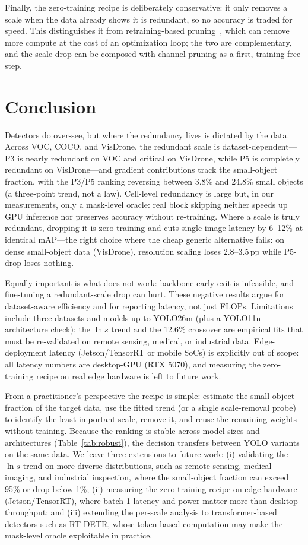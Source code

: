 \documentclass[times,twocolumn,final,authoryear]{elsarticle}
\begin{document}
Finally, the zero-training recipe is deliberately conservative: it only removes a scale when the data already shows it is redundant, so no accuracy is traded for speed. This distinguishes it from retraining-based pruning~\cite{yan2023mccp,han2015pruning}, which can remove more compute at the cost of an optimization loop; the two are complementary, and the scale drop can be composed with channel pruning as a first, training-free step.

\section{Conclusion}
Detectors do over-see, but where the redundancy lives is dictated by the data. Across VOC, COCO, and VisDrone, the redundant scale is dataset-dependent---P3 is nearly redundant on VOC and critical on VisDrone, while P5 is completely redundant on VisDrone---and gradient contributions track the small-object fraction, with the P3/P5 ranking reversing between 3.8\% and 24.8\% small objects (a three-point trend, not a law). Cell-level redundancy is large but, in our measurements, only a mask-level oracle: real block skipping neither speeds up GPU inference nor preserves accuracy without re-training. Where a scale is truly redundant, dropping it is zero-training and cuts single-image latency by 6--12\% at identical mAP---the right choice where the cheap generic alternative fails: on dense small-object data (VisDrone), resolution scaling loses 2.8--3.5\,pp while P5-drop loses nothing.

Equally important is what does not work: backbone early exit is infeasible, and fine-tuning a redundant-scale drop can hurt. These negative results argue for dataset-aware efficiency and for reporting latency, not just FLOPs. Limitations include three datasets and models up to YOLO26m (plus a YOLO11n architecture check); the $\ln s$ trend and the 12.6\% crossover are empirical fits that must be re-validated on remote sensing, medical, or industrial data. Edge-deployment latency (Jetson/TensorRT or mobile SoCs) is explicitly out of scope: all latency numbers are desktop-GPU (RTX 5070), and measuring the zero-training recipe on real edge hardware is left to future work.

From a practitioner's perspective the recipe is simple: estimate the small-object fraction of the target data, use the fitted trend (or a single scale-removal probe) to identify the least important scale, remove it, and reuse the remaining weights without training. Because the ranking is stable across model sizes and architectures (Table~\ref{tab:robust}), the decision transfers between YOLO variants on the same data. We leave three extensions to future work: (i) validating the $\ln s$ trend on more diverse distributions, such as remote sensing, medical imaging, and industrial inspection, where the small-object fraction can exceed 95\% or drop below 1\%; (ii) measuring the zero-training recipe on edge hardware (Jetson/TensorRT), where batch-1 latency and power matter more than desktop throughput; and (iii) extending the per-scale analysis to transformer-based detectors such as RT-DETR, whose token-based computation may make the mask-level oracle exploitable in practice.
\end{document}
